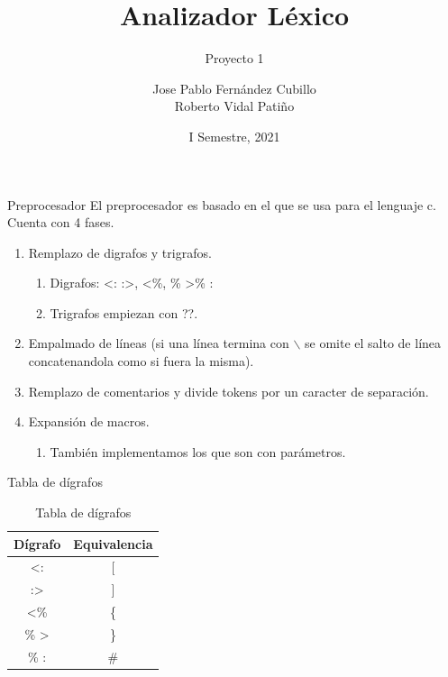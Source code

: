 \documentclass[aspectratio=43]{beamer}
\title{Analizador Léxico}
\subtitle{Proyecto 1}
\author[Jose P. Fernández, Roberto Vidal]{
    Jose Pablo Fernández Cubillo%
    \\%
    Roberto Vidal Patiño%
}
\institute[Tecnológico de Costa Rica]{
    Tecnológico de Costa Rica%
    \\%
    Compiladores e Intérpretes%
}
\date{I Semestre, 2021}
\begin{document}
    
    \frame{\titlepage}

    \begin{frame}{Preprocesador}
            El preprocesador es basado en el que se usa para el lenguaje c. Cuenta con 4 fases. \\
            \begin{enumerate}
                \item Remplazo de digrafos y trigrafos.
                \begin{enumerate}
                    \item Digrafos: \textless : :\textgreater, \textless \%, \% \textgreater \% :
                    \item Trigrafos empiezan con ??.
                \end{enumerate}
                \item Empalmado de líneas (si una línea termina con $\backslash$ se omite el salto de línea concatenandola como si fuera la misma).
                \item Remplazo de comentarios y divide tokens por un caracter de separación.
                \item Expansión de macros.
                \begin{enumerate}
                    \item También implementamos los que son con parámetros.
                \end{enumerate}
            \end{enumerate}
    \end{frame}

    \begin{frame}{Tabla de dígrafos}
        \begin{table}
            \begin{tabular}{c | c}
            Dígrafo & Equivalencia \\
            \hline \hline
                \textless : & [ \\
                :\textgreater & ] \\
                \textless \% & \{ \\
                \% \textgreater & \} \\
                \% : & \# 
            \end{tabular}
            \caption{Tabla de dígrafos}
        \end{table}

    \end{frame}
\end{document}
